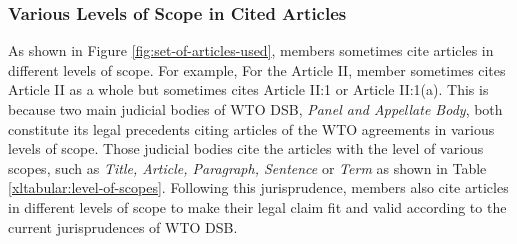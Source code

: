 \subsubsection{Various Levels of Scope in Cited Articles}
As shown in Figure \ref{fig:set-of-articles-used}, 
members sometimes
cite articles in different levels of scope. For example, 
For the Article II, member sometimes cites
Article II as a whole but sometimes cites
Article II:1 or Article II:1(a).
This is because two main judicial bodies of WTO DSB, \textit{Panel and Appellate Body}, 
both constitute its legal precedents citing articles of the WTO agreements in
various levels of scope.
Those judicial bodies cite the articles with the level of various scopes, such as \textit{Title, Article, Paragraph, Sentence} or \textit{Term} as shown in Table {\ref{xltabular:level-of-scopes}}. 
Following this jurisprudence, members also cite articles in different levels of scope to 
make their legal claim fit and valid according to the current jurisprudences of WTO DSB.\\ %


